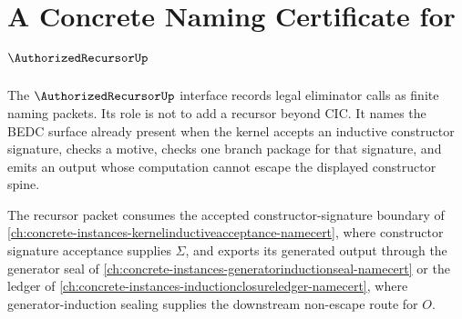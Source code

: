 \chapter{A Concrete Naming Certificate for $\AuthorizedRecursorUp$}
\label{ch:concrete-instances-authorizedrecursor-namecert}

The $\AuthorizedRecursorUp$ interface records legal eliminator calls as finite naming packets. Its role is not to add a recursor beyond CIC. It names the BEDC surface already present when the kernel accepts an inductive constructor signature, checks a motive, checks one branch package for that signature, and emits an output whose computation cannot escape the displayed constructor spine.

The recursor packet consumes the accepted constructor-signature boundary of \autoref{ch:concrete-instances-kernelinductiveacceptance-namecert}, where constructor signature acceptance supplies $\Sigma$, and exports its generated output through the generator seal of \autoref{ch:concrete-instances-generatorinductionseal-namecert} or the ledger of \autoref{ch:concrete-instances-inductionclosureledger-namecert}, where generator-induction sealing supplies the downstream non-escape route for $O$.

